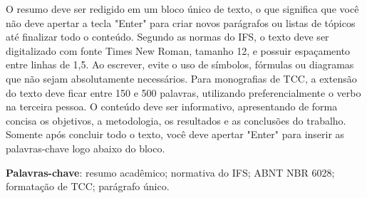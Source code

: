 
\begin{resumo}[Resumo]
  O resumo deve ser redigido em um bloco único de texto, o que significa que você não deve apertar a tecla "Enter" para criar novos parágrafos ou listas de tópicos até finalizar todo o conteúdo. Segundo as normas do IFS, o texto deve ser digitalizado com fonte Times New Roman, tamanho 12, e possuir espaçamento entre linhas de 1,5. Ao escrever, evite o uso de símbolos, fórmulas ou diagramas que não sejam absolutamente necessários. Para monografias de TCC, a extensão do texto deve ficar entre 150 e 500 palavras, utilizando preferencialmente o verbo na terceira pessoa. O conteúdo deve ser informativo, apresentando de forma concisa os objetivos, a metodologia, os resultados e as conclusões do trabalho. Somente após concluir todo o texto, você deve apertar "Enter" para inserir as palavras-chave logo abaixo do bloco.
  \par
  \noindent
  \textbf{Palavras-chave}: resumo acadêmico; normativa do IFS; ABNT NBR 6028; formatação de TCC; parágrafo único.
\end{resumo}
